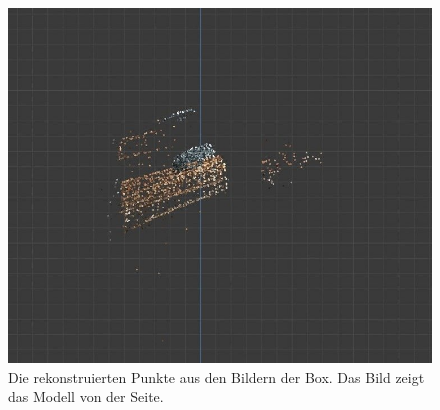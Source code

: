 \begin{figure}
    \includegraphics[width=\textwidth]{src/img/box_model_2.jpg}
    \caption{Die rekonstruierten Punkte aus den Bildern der Box. Das Bild zeigt das Modell von der Seite.}
    \label{fig:box-model-2}
\end{figure}
